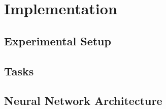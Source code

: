 \chapter{Implementation}

\section{Experimental Setup}
\section{Tasks}
\section{Neural Network Architecture}
